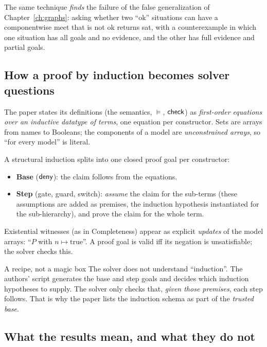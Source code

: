 The same technique \emph{finds} the failure of the false generalization of Chapter~\ref{ch:graphs}: asking whether two ``ok'' situations can have a componentwise meet that is not ok returns \textsf{sat}, with a counterexample in which one situation has all goals and no evidence, and the other has full evidence and partial goals.

\subsection{How a proof by induction becomes solver questions}

The paper states its definitions (the semantics, $\models$, $\mathsf{check}$) as \emph{first-order equations over an inductive datatype of terms}, one equation per constructor. Sets are arrays from names to Booleans; the components of a model are \emph{unconstrained arrays}, so ``for every model'' is literal.

A structural induction splits into one closed proof goal per constructor:

\begin{itemize}
\item \textbf{Base} ($\mathsf{deny}$): the claim follows from the equations.
\item \textbf{Step} (gate, guard, switch): \emph{assume} the claim for the sub-terms (these assumptions are added as premises, the induction hypothesis instantiated for the sub-hierarchy), and prove the claim for the whole term.
\end{itemize}

Existential witnesses (as in Completeness) appear as explicit \emph{updates} of the model arrays: ``$P$ with $n\mapsto\text{true}$''. A proof goal is valid iff its negation is unsatisfiable; the solver checks this.

\begin{story}{A recipe, not a magic box}
The solver does not understand ``induction''. The authors' script generates the base and step goals and decides which induction hypotheses to supply. The solver only checks that, \emph{given those premises}, each step follows. That is why the paper lists the induction schema as part of the \emph{trusted base}.
\end{story}

\subsection{What the results mean, and what they do not}

